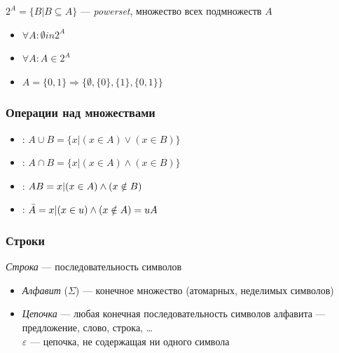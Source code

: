\documentclass[a4paper, 14pt]{extarticle}
\begin{document}
$2^A = \{ B | B \subseteq A \}$ --- \textit{powerset}, множество всех подмножеств $A$
\begin{itemize}
    \item $ \forall A: \emptyset in 2^A $
    \item $ \forall A: A \in 2^A $
    \item $ A = \{ 0, 1 \} \Rightarrow \{ \emptyset, \{0\}, \{1\}, \{0, 1\} \} $ 
\end{itemize}

\subsubsection*{Операции над множествами}
\begin{itemize}
    \item {}: $ A \cup B = \{ x | (x \in A) \vee (x \in B) \} $
    \item {}: $ A \cap B = \{ x | (x \in A) \wedge (x \in B) \} $
    \item {}: $ A \\ B = { x | (x \in A) \wedge (x \notin B) } $
    \item {}: $ \bar{A} = {x | (x \in u) \wedge (x \notin A)} = u \\ A $
\end{itemize}

\subsubsection*{Строки}
\textit{Строка} --- последовательность символов
\begin{itemize}
    \item \textit{Алфавит} ($\Sigma$) --- конечное множество (атомарных, неделимых символов)
    \item \textit{Цепочка} --- любая конечная последовательность символов алфавита --- предложение, слово, строка, \ldots{}\\
    $\varepsilon$ --- цепочка, не содержащая ни одного символа
\end{itemize}
\end{document}
